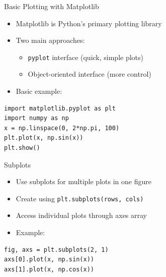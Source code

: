 \documentclass{beamer}
\begin{document}
\begin{frame}[fragile]{Basic Plotting with Matplotlib}
    \begin{itemize}
        \item Matplotlib is Python's primary plotting library
        \item Two main approaches:
        \begin{itemize}
            \item \texttt{pyplot} interface (quick, simple plots)
            \item Object-oriented interface (more control)
        \end{itemize}
        \item Basic example:
    \end{itemize}
\begin{lstlisting}
import matplotlib.pyplot as plt
import numpy as np
x = np.linspace(0, 2*np.pi, 100)
plt.plot(x, np.sin(x))
plt.show()
\end{lstlisting}
\end{frame}

\begin{frame}[fragile]{Subplots}
    \begin{itemize}
        \item Use subplots for multiple plots in one figure
        \item Create using \texttt{plt.subplots(rows, cols)}
        \item Access individual plots through axes array
        \item Example:
    \end{itemize}
\begin{lstlisting}
fig, axs = plt.subplots(2, 1)
axs[0].plot(x, np.sin(x))
axs[1].plot(x, np.cos(x))
\end{lstlisting}
\end{frame}
\end{document}
